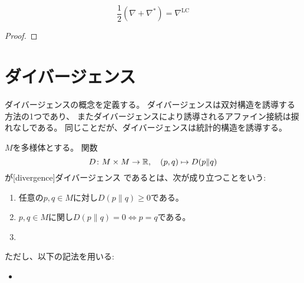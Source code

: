 \documentclass[report]{jlreq}
\begin{document}

\begin{definition}[統計的構造]
    \TODO{}
\end{definition}

\begin{proposition}
    \begin{equation}
        \frac{1}{2} (\nabla + \nabla^*)
            = \nabla^{\mathrm{LC}}
    \end{equation}
    \TODO{}
\end{proposition}

\begin{proof}
    \TODO{}
\end{proof}


%
\section{ダイバージェンス}

ダイバージェンスの概念を定義する。
ダイバージェンスは双対構造を誘導する方法の1つであり、
またダイバージェンスにより誘導されるアファイン接続は捩れなしである。
同じことだが、ダイバージェンスは統計的構造を誘導する。

\begin{definition}[ダイバージェンス]
    $M$を多様体とする。
    \smooth 関数
    \begin{equation}
        D \colon M \times M \to \mathbb{R},
            \quad
            (p, q) \mapsto D(p \| q)
    \end{equation}
    が[divergence]{ダイバージェンス}
    であるとは、次が成り立つことをいう:
    \begin{enumerate}
        \item 任意の$p, q \in M$に対し$D(p \| q) \geq 0$である。
        \item $p, q \in M$に関し$D(p \| q) = 0 \iff p = q$である。
        \item \TODO{}
    \end{enumerate}
    ただし、以下の記法を用いる:
    \begin{itemize}
        \item \TODO{}
    \end{itemize}
\end{definition}
\end{document}
